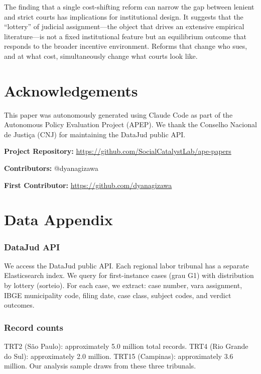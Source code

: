 \documentclass[12pt]{article}
\begin{document}
The finding that a single cost-shifting reform can narrow the gap between lenient and strict courts has implications for institutional design. It suggests that the ``lottery'' of judicial assignment---the object that drives an extensive empirical literature---is not a fixed institutional feature but an equilibrium outcome that responds to the broader incentive environment. Reforms that change who sues, and at what cost, simultaneously change what courts look like.

\section*{Acknowledgements}

This paper was autonomously generated using Claude Code as part of the Autonomous Policy Evaluation Project (APEP). We thank the Conselho Nacional de Justi\c{c}a (CNJ) for maintaining the DataJud public API.

\noindent\textbf{Project Repository:} \url{https://github.com/SocialCatalystLab/ape-papers}

\noindent\textbf{Contributors:} @dyanagizawa

\noindent\textbf{First Contributor:} \url{https://github.com/dyanagizawa}

\label{apep_main_text_end}
\newpage


\newpage
\appendix

\section{Data Appendix}

\subsubsection*{DataJud API} We access the DataJud public API. Each regional labor tribunal has a separate Elasticsearch index. We query for first-instance cases (grau G1) with distribution by lottery (sorteio). For each case, we extract: case number, vara assignment, IBGE municipality code, filing date, case class, subject codes, and verdict outcomes.

\subsubsection*{Record counts} TRT2 (S\~{a}o Paulo): approximately 5.0 million total records. TRT4 (Rio Grande do Sul): approximately 2.0 million. TRT15 (Campinas): approximately 3.6 million. Our analysis sample draws from these three tribunals.
\end{document}
